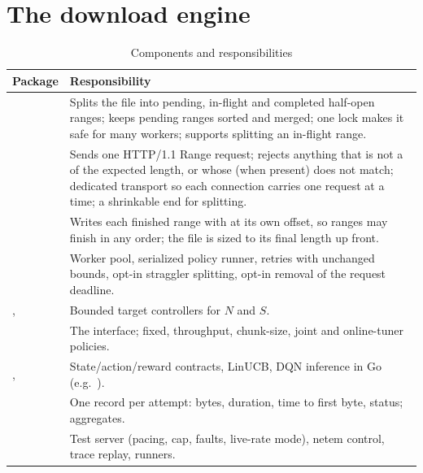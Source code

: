 \section{The download engine}
\begin{table}[H]\centering
\caption{Components and responsibilities}\label{tab:components}
\begin{tabularx}{\linewidth}{@{}lL@{}}
\toprule
\textbf{Package} & \textbf{Responsibility}\\
\midrule
{} & Splits the file into pending, in-flight and completed half-open ranges; keeps pending ranges sorted and merged; one lock makes it safe for many workers; supports splitting an in-flight range.\\
 & Sends one HTTP/1.1 Range request; rejects anything that is not a  of the expected length, or whose  (when present) does not match; dedicated transport so each connection carries one request at a time; a shrinkable end for splitting.\\
 & Writes each finished range with  at its own offset, so ranges may finish in any order; the file is sized to its final length up front.\\
 & Worker pool, serialized policy runner, retries with unchanged bounds, opt-in straggler splitting, opt-in removal of the request deadline.\\
,  & Bounded target controllers for $N$ and $S$.\\
 & The  interface; fixed, throughput, chunk-size, joint and online-tuner policies.\\
,  & State/action/reward contracts, LinUCB, DQN inference in Go (e.g.\ ).\\
 & One record per attempt: bytes, duration, time to first byte, status; aggregates.\\
 & Test server (pacing, cap, faults, live-rate mode), netem control, trace replay, runners.\\
\bottomrule
\end{tabularx}
\end{table}


